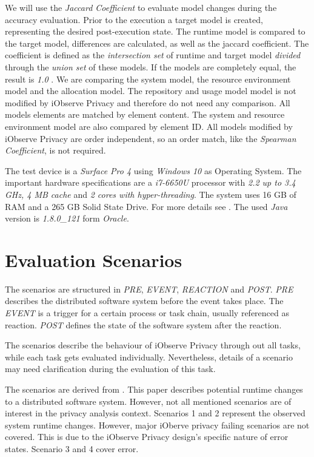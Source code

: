We will use the \textit{Jaccard Coefficient} to evaluate model changes during the accuracy evaluation. Prior to the execution a target model is created, representing the desired post-execution state. The runtime model is compared to the target model, differences are calculated, as well as the jaccard coefficient. The coefficient is defined as the \textit{intersection set} of runtime and target model \textit{divided} through the \textit{union set} of these models. If the models are completely equal, the result is \textit{1.0} \cite{Andale.20161202}. We are comparing the system model, the resource environment model and the allocation model. The repository and usage model model is not modified by iObserve Privacy and therefore do not need any comparison. All models elements are matched by element content. The system and resource environment model are also compared by element ID. All models modified by iObserve Privacy are order independent, so an order match, like the \textit{Spearman Coefficient}, is not required.

The test device is a \textit{Surface Pro 4} using \textit{Windows 10} as Operating System. The important hardware specifications are a \textit{i7-6650U} processor with \textit{2.2 up to 3.4 GHz, 4 MB cache} and \textit{2 cores with hyper-threading}. The system uses 16 GB of RAM and a 265 GB Solid State Drive. For more details see \cite{Wikipedia.20170613}. The used \textit{Java} version is \textit{1.8.0\_121} form \textit{Oracle}.


\section{Evaluation Scenarios}
\label{sec:Evaluation:scenarios}

The scenarios are structured in \textit{PRE}, \textit{EVENT}, \textit{REACTION} and \textit{POST}. \textit{PRE} describes the distributed software system before the event takes place. The \textit{EVENT} is a trigger for a certain process or task chain, usually referenced as reaction. \textit{POST} defines the state of the software system after the reaction.

The scenarios describe the behaviour of iObserve Privacy through out all tasks, while each task gets evaluated individually. Nevertheless, details of a scenario may need clarification during the evaluation of this task.

The scenarios are derived from \cite{Heinrich.2016b}. This paper describes potential runtime changes to a distributed software system. However, not all mentioned scenarios are of interest in the privacy analysis context. Scenarios 1 and 2 represent the observed system runtime changes. However, major iOberve privacy failing scenarios are not covered. This is due to the iObserve Privacy design's specific nature of error states. Scenario 3 and 4 cover error.


